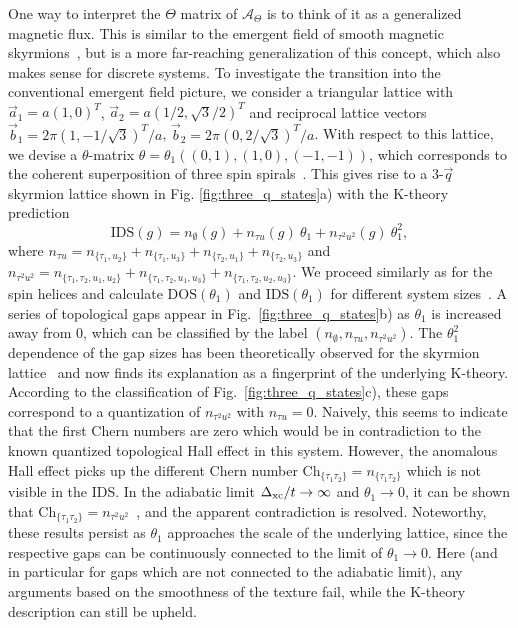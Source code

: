 \documentclass[
    10pt,
    aps,
    prl,
    twocolumn,
    floatfix,
    superscriptaddress
]{revtex4-2}
\newcommand{\SupplementalMaterial}{\cite{Note1}}
\begin{document}
One way to interpret the $\Theta$ matrix of $\mathcal{A}_\Theta$ is to think of it as a generalized magnetic flux.
This is similar to the emergent field of smooth magnetic skyrmions~\cite{Bliokh2005, Schulz2012}, but is a more far-reaching generalization of this concept, which also makes sense for discrete systems.
To investigate the transition into the conventional emergent field picture, we consider a triangular lattice with $\vec{a}_1 = a (1,0)^T$, $\vec{a}_2 = a (1/2,\sqrt{3}/2 )^T$ and reciprocal lattice vectors
$\vec{b}_1 = 2 \pi (1, -1/\sqrt{3})^T / a$, $	\vec{b}_2 = 2 \pi (0, 2 / \sqrt{3})^T / a$.
With respect to this lattice, we devise a $\theta$-matrix
$ \theta = \theta_1 (( 
	0, 1),
	(  1,0 ),
	( -1,-1 )) $,
which corresponds to the coherent superposition of three spin spirals~\SupplementalMaterial. 
This gives rise to a 3-$\vec{q}$ skyrmion lattice shown in Fig. \ref{fig:three_q_states}a) with the K-theory prediction
\begin{equation}
     \mathrm{IDS}(g) = n_\emptyset(g) + n_{\tau u}(g)~\theta_1 + n_{\tau^2u^2}(g)~\theta_1^2,
    \label{eq:k_prediction_skx}
\end{equation}
where $n_{\tau u} = n_{ \lbrace \tau_1 , u_2\rbrace} + n_{\lbrace\tau_1 , u_3\rbrace}+n_{\lbrace\tau_2 , u_1\rbrace}+n_{\lbrace\tau_2 , u_3\rbrace}$ and $n_{\tau^2u^2} = n_{\lbrace\tau_1, \tau_2 , u_1 , u_2\rbrace} +  n_{\lbrace\tau_1 , \tau_2 ,  u_1 ,  u_3\rbrace} + n_{\lbrace\tau_1 , \tau_2 ,  u_2  , u_3 \rbrace}$.
We proceed similarly as for the spin helices and calculate $\mathrm{DOS}(\theta_1)$ and $\mathrm{IDS}(\theta_1)$ for different system sizes~\SupplementalMaterial.
A series of topological gaps appear in Fig.~\ref{fig:three_q_states}b) as $\theta_1$ is increased away from $0$, which can be classified by the label $(n_\emptyset, n_{\tau u}, n_{\tau^2u^2})$.
The $\theta_1^2$ dependence of the gap sizes  has been theoretically observed for the skyrmion lattice~\cite{Hamamoto2015} and now finds its explanation as a fingerprint of the underlying K-theory.
According to the classification of Fig.~\ref{fig:three_q_states}c), 
these gaps correspond to a quantization of $n_{\tau^2u^2}$ with $n_{\tau u}=0$.
Naively, this seems to indicate that the first Chern numbers are zero which would be in contradiction to the known quantized topological Hall effect in this system.
However, the anomalous Hall effect picks up the different Chern number $\mathrm{Ch}_{ \lbrace \tau_1 \tau_2 \rbrace } = n_{ \lbrace \tau_1 \tau_2 \rbrace }$ \cite{Prodan2017} which is not visible in the IDS.
In the adiabatic limit $\Delta_\mathrm{xc}/t \to \infty$ and $\theta_1 \to 0$, it can be shown that $\mathrm{Ch}_{ \lbrace \tau_1 \tau_2 \rbrace } = n_{\tau^2u^2}$~\SupplementalMaterial, and the apparent contradiction is resolved.
Noteworthy, these results persist as $\theta_1$ approaches the scale of the underlying lattice, since the respective gaps can be continuously connected to the limit of $\theta_1 \to 0$.
Here (and in particular for gaps which are not connected to the adiabatic limit), any arguments based on the smoothness of the texture fail, while the K-theory description can still be upheld.
\end{document}
